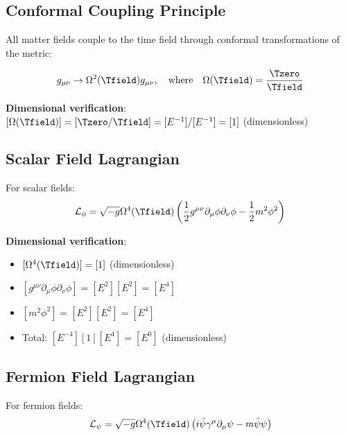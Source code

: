 	\subsection{Conformal Coupling Principle}
	\label{subsec:conformal_coupling}
	
	All matter fields couple to the time field through conformal transformations of the metric:
	
	\begin{equation}
		g_{\mu\nu} \to \Omega^2(\Tfield) g_{\mu\nu}, \quad \text{where} \quad \Omega(\Tfield) = \frac{\Tzero}{\Tfield}
		\label{eq:conformal_transformation}
	\end{equation}
	
	\textbf{Dimensional verification}: $[\Omega(\Tfield)] = [\Tzero/\Tfield] = [E^{-1}]/[E^{-1}] = [1]$ (dimensionless) \checkmark
	
	\subsection{Scalar Field Lagrangian}
	\label{subsec:scalar_field_lagrangian}
	
	For scalar fields:
	\begin{equation}
		\mathcal{L}_\phi = \sqrt{-g} \Omega^4(\Tfield) \left(\frac{1}{2} g^{\mu\nu} \partial_\mu \phi \partial_\nu \phi - \frac{1}{2} m^2 \phi^2\right)
		\label{eq:scalar_lagrangian}
	\end{equation}
	
	\textbf{Dimensional verification}:
	\begin{itemize}
		\item $[\Omega^4(\Tfield)] = [1]$ (dimensionless)
		\item $[g^{\mu\nu} \partial_\mu \phi \partial_\nu \phi] = [E^2][E^2] = [E^4]$
		\item $[m^2 \phi^2] = [E^2][E^2] = [E^4]$
		\item Total: $[E^{-4}][1][E^4] = [E^0]$ (dimensionless) \checkmark
	\end{itemize}
	
	\subsection{Fermion Field Lagrangian}
	\label{subsec:fermion_field_lagrangian}
	
	For fermion fields:
	\begin{equation}
		\mathcal{L}_\psi = \sqrt{-g} \Omega^4(\Tfield) \left(i\bar{\psi}\gamma^\mu\partial_\mu\psi - m\bar{\psi}\psi\right)
		\label{eq:fermion_lagrangian}
	\end{equation}
	
